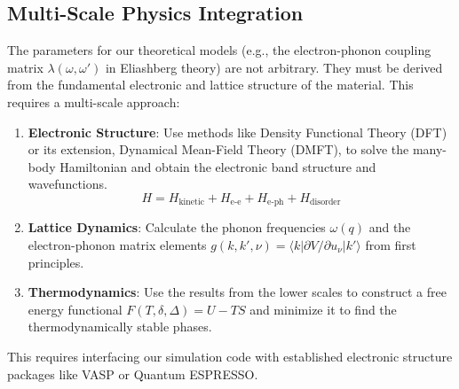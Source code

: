 \subsection{Multi-Scale Physics Integration}
The parameters for our theoretical models (e.g., the electron-phonon coupling matrix $\lambda(\omega,\omega')$ in Eliashberg theory) are not arbitrary. They must be derived from the fundamental electronic and lattice structure of the material. This requires a multi-scale approach:
\begin{enumerate}
    \item \textbf{Electronic Structure}: Use methods like Density Functional Theory (DFT) or its extension, Dynamical Mean-Field Theory (DMFT), to solve the many-body Hamiltonian and obtain the electronic band structure and wavefunctions.
    \begin{equation}
    H = H_{\text{kinetic}} + H_{\text{e-e}} + H_{\text{e-ph}} + H_{\text{disorder}}
    \end{equation}
    \item \textbf{Lattice Dynamics}: Calculate the phonon frequencies $\omega(q)$ and the electron-phonon matrix elements $g(k,k',\nu) = \langle k | \partial V / \partial u_\nu | k' \rangle$ from first principles.
    \item \textbf{Thermodynamics}: Use the results from the lower scales to construct a free energy functional $F(T, \delta, \Delta) = U - TS$ and minimize it to find the thermodynamically stable phases.
\end{enumerate}
This requires interfacing our simulation code with established electronic structure packages like VASP or Quantum ESPRESSO.
